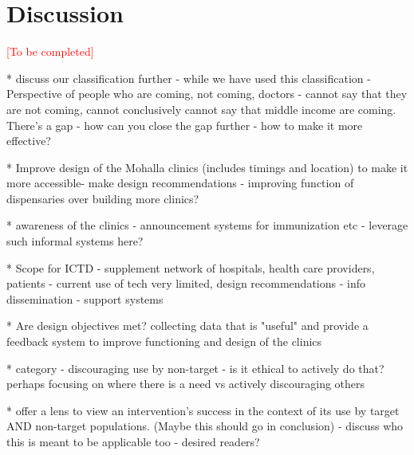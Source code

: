 \section{Discussion}

\textcolor{red}{[To be completed]}

* discuss our classification further - while we have used this classification - Perspective of people who are coming, not coming, doctors - cannot say that they are not coming, cannot conclusively cannot say that middle income are coming. There’s a gap - how can you close the gap further - how to make it more effective?

* Improve design of the Mohalla clinics (includes timings and location) to make it more accessible- make design recommendations - improving function of dispensaries over building more clinics?

* awareness of the clinics - announcement systems for immunization etc - leverage such informal systems here?

* Scope for ICTD - supplement network of hospitals, health care providers, patients - current use of tech very limited, design recommendations - info dissemination - support systems

* Are design objectives met? collecting data that is "useful" and provide a feedback system to improve functioning and design of the clinics

* category - discouraging use by non-target - is it ethical to actively do that? perhaps focusing on where there is a need vs actively discouraging others

* offer a lens to view an intervention's success in the context of its use by target AND non-target populations. (Maybe this should go in conclusion) - discuss who this is meant to be applicable too - desired readers?







